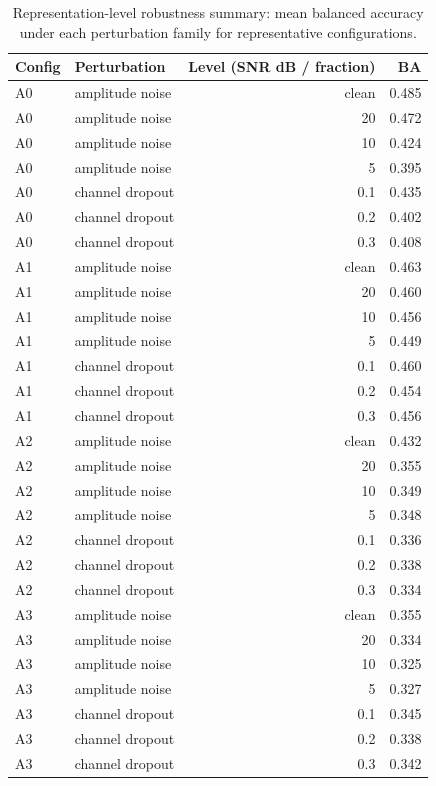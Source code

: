 \begin{table}[t]\centering\footnotesize
\caption{Representation-level robustness summary: mean balanced accuracy under each perturbation family for representative configurations.}
\label{tab:robustness_summary}
\begin{tabular}{llrr}
\toprule
Config & Perturbation & Level (SNR dB / fraction) & BA \\
\midrule
A0 & amplitude noise & clean & 0.485 \\
A0 & amplitude noise & 20 & 0.472 \\
A0 & amplitude noise & 10 & 0.424 \\
A0 & amplitude noise & 5 & 0.395 \\
A0 & channel dropout & 0.1 & 0.435 \\
A0 & channel dropout & 0.2 & 0.402 \\
A0 & channel dropout & 0.3 & 0.408 \\
A1 & amplitude noise & clean & 0.463 \\
A1 & amplitude noise & 20 & 0.460 \\
A1 & amplitude noise & 10 & 0.456 \\
A1 & amplitude noise & 5 & 0.449 \\
A1 & channel dropout & 0.1 & 0.460 \\
A1 & channel dropout & 0.2 & 0.454 \\
A1 & channel dropout & 0.3 & 0.456 \\
A2 & amplitude noise & clean & 0.432 \\
A2 & amplitude noise & 20 & 0.355 \\
A2 & amplitude noise & 10 & 0.349 \\
A2 & amplitude noise & 5 & 0.348 \\
A2 & channel dropout & 0.1 & 0.336 \\
A2 & channel dropout & 0.2 & 0.338 \\
A2 & channel dropout & 0.3 & 0.334 \\
A3 & amplitude noise & clean & 0.355 \\
A3 & amplitude noise & 20 & 0.334 \\
A3 & amplitude noise & 10 & 0.325 \\
A3 & amplitude noise & 5 & 0.327 \\
A3 & channel dropout & 0.1 & 0.345 \\
A3 & channel dropout & 0.2 & 0.338 \\
A3 & channel dropout & 0.3 & 0.342 \\

\end{tabular}
\end{table}
